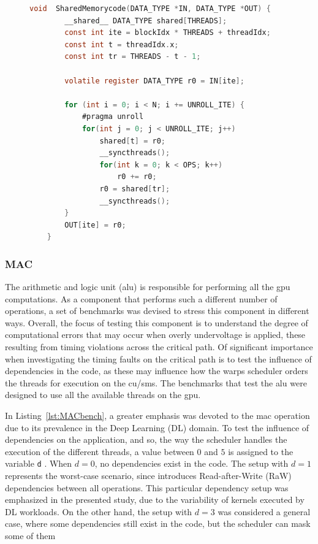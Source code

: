 \begin{figure}[h]
    \begin{lstlisting}[language=C, caption=Shared Memory Benchmark code, label=lst:SMcode, basicstyle=\footnotesize\ttfamily, abovecaptionskip=0pt, captionpos=b]
    void  SharedMemorycode(DATA_TYPE *IN, DATA_TYPE *OUT) {
        __shared__ DATA_TYPE shared[THREADS];
        const int ite = blockIdx * THREADS + threadIdx;
        const int t = threadIdx.x;
        const int tr = THREADS - t - 1;
        
        volatile register DATA_TYPE r0 = IN[ite];
        
        for (int i = 0; i < N; i += UNROLL_ITE) {
            #pragma unroll
            for(int j = 0; j < UNROLL_ITE; j++)  
                shared[t] = r0;
                __syncthreads();
                for(int k = 0; k < OPS; k++) 
                    r0 += r0;
                r0 = shared[tr];
                __syncthreads();
        }
        OUT[ite] = r0;
    }
    \end{lstlisting}
\end{figure}

\subsubsection{MAC}

The arithmetic and logic unit (\acrshort{alu}) is responsible for performing all the \acrshort{gpu} computations.  As a component that performs such a different number of operations, a set of benchmarks was devised to stress this component in different ways. Overall, the focus of testing this component is to understand the degree of computational errors that may occur when overly undervoltage is applied, these resulting from timing violations across the critical path. Of significant importance when investigating the timing faults on the critical path is to test the influence of dependencies in the code, as these may influence how the warps scheduler orders the threads for execution on the \acrshort{cu}/\acrshort{sm}s. The benchmarks that test the \acrshort{alu} were designed to use all the available threads on the \acrshort{gpu}.

In Listing~\ref{lst:MACbench}, a greater emphasis was devoted to the \acrshort{mac} operation due to its prevalence in the Deep Learning (DL) domain. To test the influence of dependencies on the application, and so, the way the scheduler handles the execution of the different threads, a value between $0$ and $5$ is assigned to the variable \texttt{d} . When $d=0$, no dependencies exist in the code. The setup with $d=1$ represents the worst-case scenario, since introduces Read-after-Write (RaW) dependencies between all operations. This particular dependency setup was emphasized in the presented study, due to the variability of kernels executed by DL workloads. On the other hand, the setup with $d=3$ was considered a general case, where some dependencies still exist in the code, but the scheduler can mask some of them



